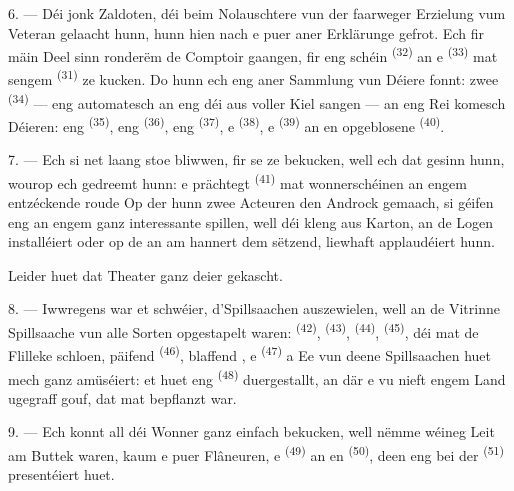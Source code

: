 6. --- Déi jonk Zaldoten, déi beim Nolauschtere vun der faarweger Erzielung vum
Veteran gelaacht hunn, hunn hien nach e puer aner Erklärunge gefrot. Ech fir mäin
Deel sinn ronderëm de Comptoir gaangen, fir eng schéin 
\textsuperscript{(32)} an e  \textsuperscript{(33)} mat sengem
 \textsuperscript{(31)} ze kucken. Do hunn ech eng aner Sammlung vun
Déiere fonnt: zwee  \textsuperscript{(34)} --- eng automatesch
 an eng  déi aus voller Kiel sangen --- an eng
Rei komesch Déieren: eng  \textsuperscript{(35)}, eng 
\textsuperscript{(36)}, eng  \textsuperscript{(37)}, e
 \textsuperscript{(38)}, e  \textsuperscript{(39)} an
en opgeblosene  \textsuperscript{(40)}.

7. --- Ech si net laang stoe bliwwen, fir se ze bekucken, well ech dat gesinn hunn,
wourop ech gedreemt hunn: e prächtegt  \textsuperscript{(41)}
mat wonnerschéinen  an engem entzéckende roude  Op der
 hunn zwee Acteuren den Androck gemaach, si géifen eng  an
engem ganz interessante  spillen, well déi kleng  aus
Karton, an de Logen installéiert oder op de  an am
 hannert dem  sëtzend, liewhaft applaudéiert
hunn.

Leider huet dat Theater ganz deier gekascht.

8. --- Iwwregens war et schwéier, d'Spillsaachen auszewielen, well an de Vitrinne
Spillsaache vun alle Sorten opgestapelt waren:  \textsuperscript{(42)},
 \textsuperscript{(43)},  \textsuperscript{(44)},
 \textsuperscript{(45)}, déi mat de Flilleke schloen, päifend
 \textsuperscript{(46)}, blaffend , e
 \textsuperscript{(47)} a  Ee vun
deene Spillsaachen huet mech ganz amüséiert: et huet eng 
\textsuperscript{(48)} duergestallt, an där e  vu 
nieft engem Land ugegraff gouf, dat mat  bepflanzt war.


9. --- Ech konnt all déi Wonner ganz einfach bekucken, well nëmme wéineg Leit am
Buttek waren, kaum e puer Flâneuren, e  \textsuperscript{(49)} an en
 \textsuperscript{(50)}, deen eng  bei der
 \textsuperscript{(51)} presentéiert huet.

